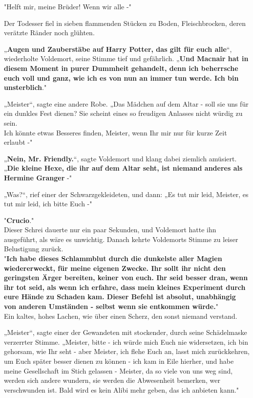 {"Helft mir, meine Brüder! Wenn wir alle -"

Der Todesser fiel in sieben flammenden Stücken zu Boden, Fleischbrocken, deren verätzte Ränder noch glühten.

„\textbf{Augen und Zauberstäbe auf Harry Potter, das gilt für euch alle}“, wiederholte Voldemort, seine Stimme tief und gefährlich. „\textbf{Und Macnair hat in diesem Moment in purer Dummheit gehandelt, denn ich beherrsche euch voll und ganz, wie ich es von nun an immer tun werde. Ich bin unsterblich}."

„Meister“, sagte eine andere Robe. „Das Mädchen auf dem Altar - soll sie uns für ein dunkles Fest dienen? Sie scheint eines so freudigen Anlasses nicht würdig zu sein.\\ Ich könnte etwas Besseres finden, Meister, wenn Ihr mir nur für kurze Zeit erlaubt -"

„\textbf{Nein, Mr. Friendly.}“, sagte Voldemort und klang dabei ziemlich amüsiert. „\textbf{Die kleine Hexe, die ihr auf dem Altar seht, ist niemand anderes als Hermine Granger} -"

„Was?“, rief einer der Schwarzgekleideten, und dann: „Es tut mir leid, Meister, es tut mir leid, ich bitte Euch -"

"\textbf{Crucio}."\\ Dieser Schrei dauerte nur ein paar Sekunden, und Voldemort hatte ihn ausgeführt, als wäre es unwichtig. Danach kehrte Voldemorts Stimme zu leiser Belustigung zurück.\\ "\textbf{Ich habe dieses Schlammblut durch die dunkelste aller Magien wiedererweckt, für meine eigenen Zwecke. Ihr sollt ihr nicht den geringsten Ärger bereiten, keiner von euch. Ihr seid besser dran, wenn ihr tot seid, als wenn ich erfahre, dass mein kleines Experiment durch eure Hände zu Schaden kam. Dieser Befehl ist absolut, unabhängig von anderen Umständen - selbst wenn sie entkommen würde.}"\\ Ein kaltes, hohes Lachen, wie über einen Scherz, den sonst niemand verstand.

„Meister“, sagte einer der Gewandeten mit stockender, durch seine Schädelmaske verzerrter Stimme. „Meister, bitte - ich würde mich Euch nie widersetzen, ich bin gehorsam, wie Ihr seht - aber Meister, ich flehe Euch an, lasst mich zurückkehren, um Euch später besser dienen zu können - ich kam in Eile hierher, und habe meine Gesellschaft im Stich gelassen - Meister, da so viele von uns weg sind, werden sich andere wundern, sie werden die Abwesenheit bemerken, wer verschwunden ist. Bald wird es kein Alibi mehr geben, das ich anbieten kann."

}
